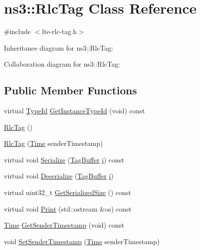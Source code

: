 \hypertarget{classns3_1_1RlcTag}{}\section{ns3\+:\+:Rlc\+Tag Class Reference}
\label{classns3_1_1RlcTag}


{\ttfamily \#include $<$lte-\/rlc-\/tag.\+h$>$}



Inheritance diagram for ns3\+:\+:Rlc\+Tag\+:


Collaboration diagram for ns3\+:\+:Rlc\+Tag\+:
\subsection*{Public Member Functions}
\begin{DoxyCompactItemize}
\item 
virtual \hyperlink{classns3_1_1TypeId}{Type\+Id} \hyperlink{classns3_1_1RlcTag_a1deebe4b3e26be84e554230dc0a6154f}{Get\+Instance\+Type\+Id} (void) const 
\item 
\hyperlink{classns3_1_1RlcTag_a43006992d1d1a2f0427835701c2f075d}{Rlc\+Tag} ()
\item 
\hyperlink{classns3_1_1RlcTag_a11597aab2070d66a78c28c5803859ed2}{Rlc\+Tag} (\hyperlink{classns3_1_1Time}{Time} sender\+Timestamp)
\item 
virtual void \hyperlink{classns3_1_1RlcTag_affc948cb490c75300e091ba7c76f8c8b}{Serialize} (\hyperlink{classns3_1_1TagBuffer}{Tag\+Buffer} \hyperlink{lte__uplink__power__control_8m_a6f6ccfcf58b31cb6412107d9d5281426}{i}) const 
\item 
virtual void \hyperlink{classns3_1_1RlcTag_a56612a38cae85bb77494aeeb337f6346}{Deserialize} (\hyperlink{classns3_1_1TagBuffer}{Tag\+Buffer} \hyperlink{lte__uplink__power__control_8m_a6f6ccfcf58b31cb6412107d9d5281426}{i})
\item 
virtual uint32\+\_\+t \hyperlink{classns3_1_1RlcTag_a15a8fbf395f2036882516f8f9ca8a7da}{Get\+Serialized\+Size} () const 
\item 
virtual void \hyperlink{classns3_1_1RlcTag_a4afe822757f440d37c52267d60a804a8}{Print} (std\+::ostream \&os) const 
\item 
\hyperlink{classns3_1_1Time}{Time} \hyperlink{classns3_1_1RlcTag_aa1e419c368ebf783506bcf40903454e0}{Get\+Sender\+Timestamp} (void) const 
\item 
void \hyperlink{classns3_1_1RlcTag_aa792ea36590c46543be42bb7982abc72}{Set\+Sender\+Timestamp} (\hyperlink{classns3_1_1Time}{Time} sender\+Timestamp)
\end{DoxyCompactItemize}
